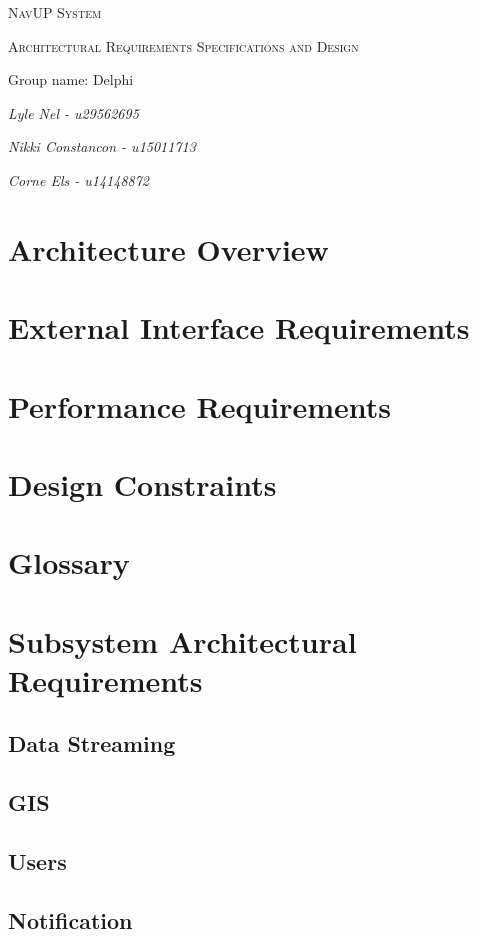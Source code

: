 \documentclass{article}
\begin{document}
\begin{titlepage}
	\centering
	\vfill
	{\scshape\LARGE NavUP System\par}
	\vfill
	{\scshape\Large Architectural Requirements Specifications and Design\par}
	\vfill
	{\Large Group name: Delphi\par}
	\bigskip 
	{\itshape\Large Lyle Nel - u29562695\par}
	{\itshape\Large Nikki Constancon - u15011713\par}
	{\itshape\Large Corne Els - u14148872\par}	
	\vfill
\end{titlepage}

\tableofcontents

\clearpage

\section{Architecture Overview}


\section{External Interface Requirements}


\section{Performance Requirements}


\section{Design Constraints}


\section{Glossary}


\section{Subsystem Architectural Requirements}

  \subsection{Data Streaming}
	

  \subsection{GIS}
	

  \subsection{Users}
	

  \subsection{Notification}
	
\end{document}
